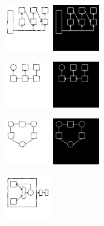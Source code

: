 \documentclass{article}
\begin{document}
\begin{figure}[H]
  \begin{minipage}[t]{2.25cm}
    \includegraphics[width = 2cm]{figures/expert-73.png}
    \includegraphics[width = 2cm]{figures/73-parse.png}     
  \end{minipage}
  \begin{minipage}[t]{2.25cm}
    \includegraphics[width = 2cm]{figures/expert-21.png}
    \includegraphics[width = 2cm]{figures/21-parse.png}    
  \end{minipage}
  \begin{minipage}[t]{2.25cm}
    \includegraphics[width = 2cm]{figures/expert-77.png}
    \includegraphics[width = 2cm]{figures/77-parse.png}    
    \end{minipage}
  \begin{minipage}[t]{2.25cm}
    \includegraphics[width = 2cm]{figures/expert-1.png}

\end{minipage}
\end{figure}
\end{document}
